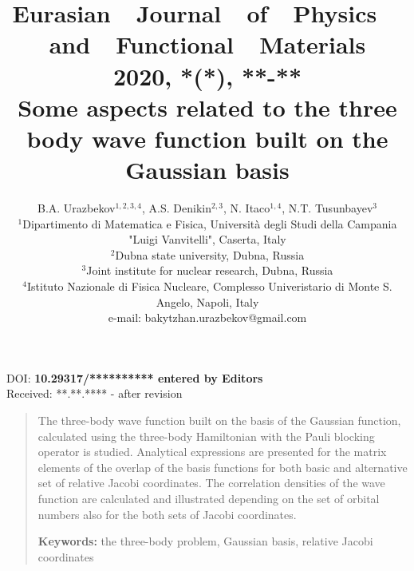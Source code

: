 \documentclass[12pt,a4paper,twoside]{article}
\begin{document}

\newenvironment{sciabstract}{
\begin{quote} \scriptsize}
{\end{quote}}

\pretitle{\begin{center}\Huge\bfseries} %

\title{{\normalsize{Eurasian~~Journal~~of~~Physics~~and~~Functional~~Materials\\ 
2020, \textbf{*}(*),   **-**}} \\[2.0cm]%
Some aspects related to the three body wave function built on the Gaussian basis}%

\author
{B.A. Urazbekov$^{1,2,3,4}$, A.S. Denikin$^{2,3}$, N. Itaco$^{1,4}$, N.T. Tusunbayev$^3$\\ 
\scriptsize{$^1$Dipartimento di Matematica e Fisica, Universit\`a degli Studi della Campania "Luigi Vanvitelli", Caserta, Italy }\\
\scriptsize{$^2$Dubna state university, Dubna, Russia}\\
\scriptsize{$^3$Joint institute for nuclear research, Dubna, Russia}\\
\scriptsize{$^4$Istituto Nazionale di Fisica Nucleare, Complesso Univeristario di Monte S. Angelo, Napoli, Italy}\\
\scriptsize{e-mail: bakytzhan.urazbekov@gmail.com}\\%
}

\date{}%
\maketitle

\begin{flushleft}
\scriptsize{ DOI: \textbf{ 10.29317/********** entered by Editors}\\
Received: **.**.**** - after revision}

\end{flushleft} 

\begin{sciabstract}%

The three-body wave function built on the basis of the Gaussian function, calculated using the three-body Hamiltonian with the Pauli blocking operator is studied. Analytical expressions are presented for the matrix elements of the overlap of the basis functions for both basic and alternative set of relative Jacobi coordinates. The correlation densities of the wave function are calculated and illustrated depending on the set of orbital numbers also for the both sets of Jacobi coordinates.


{\textbf{Keywords:} the three-body problem, Gaussian basis, relative Jacobi coordinates}

\end{sciabstract}
\end{document}
